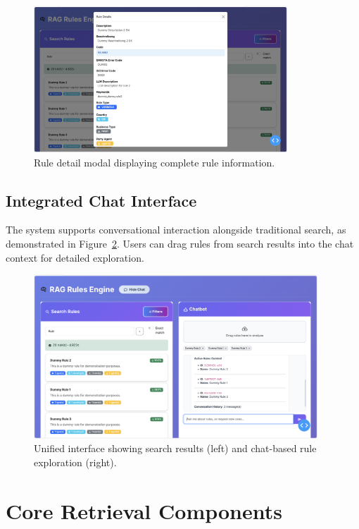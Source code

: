 \begin{figure}[!htbp]
\centering
\includegraphics[width=0.85\textwidth]{Figures/rule_details.png}
\caption{Rule detail modal displaying complete rule information.}
\label{fig:rule-details}
\end{figure}

\subsection{Integrated Chat Interface}

The system supports conversational interaction alongside traditional search, as demonstrated in Figure~\ref{fig:search-chat}. Users can drag rules from search results into the chat context for detailed exploration.

\begin{figure}[!htbp]
\centering
\includegraphics[width=0.95\textwidth]{Figures/search_chat_example.png}
\caption{Unified interface showing search results (left) and chat-based rule exploration (right).}
\label{fig:search-chat}
\end{figure}

\section{Core Retrieval Components}

